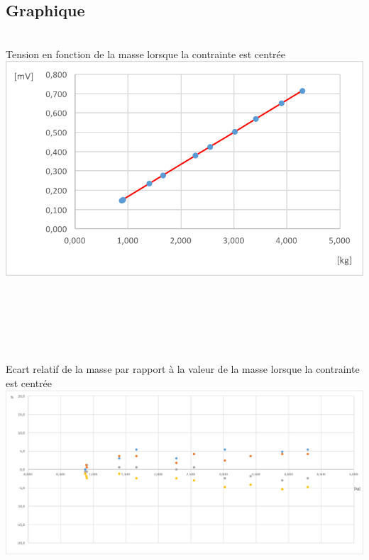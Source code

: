 \documentclass[11pt,a4paper]{report}
\begin{document}
\subsection*{Graphique}
\begin{center}
~\\
Tension en fonction de la masse lorsque la contrainte est centrée~\\
\includegraphics[scale=1]{Graphique1.png} ~\\~\\~\\~\\~\\~\\
Ecart relatif de la masse par rapport à la valeur de la masse lorsque la contrainte est centrée~\\
\includegraphics[scale=0.4]{Graphique2.png} ~\\
\end{center}
\newpage
\end{document}

